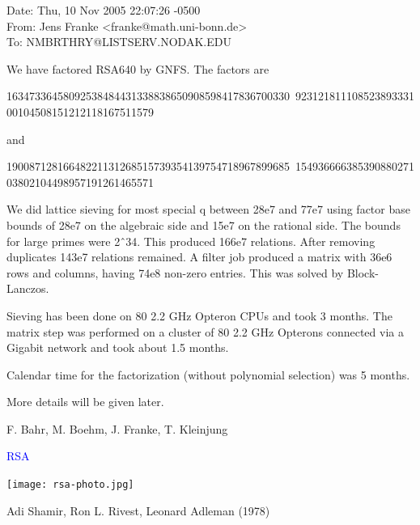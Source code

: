 \documentclass[landscape]{powersem} %
\newcommand{\psd}{\pause}%
\newcommand{\heading}[1]{%
 \begin{center}
  \large\bf
  \Ovalbox{{\textcolor{conceptcolor}{#1}}}%
 \end{center}
 \vspace{1ex minus 1ex}}
\begin{document}
\begin{slide}
\heading{Last Minute News}\vspace{-4mm}\psd
\begin{scriptsize}
\begin{tt}
\noindent
 Date: Thu, 10 Nov 2005 22:07:26 -0500\\
 From: Jens Franke <franke@math.uni-bonn.de>\\
 To: NMBRTHRY@LISTSERV.NODAK.EDU

We have factored RSA640 by GNFS. The factors are

16347336458092538484431338838650908598417836700330\
92312181110852389333100104508151212118167511579

and

19008712816648221131268515739354139754718967899685\
15493666638539088027103802104498957191261465571

We did lattice sieving for most special q between 28e7 and 77e7
using factor base bounds of 28e7 on the algebraic side and 15e7 on
the rational side. The bounds for large primes were 2\^\ 34. This
produced 166e7 relations. After removing duplicates 143e7 relations
remained. A filter job produced a matrix with 36e6 rows and columns,
having 74e8 non-zero entries. This was solved by Block-Lanczos.

Sieving has been done on 80 2.2 GHz Opteron CPUs and took 3 months.
The matrix step was performed on a cluster of 80 2.2 GHz Opterons
connected via a Gigabit network and took about 1.5 months.

Calendar time for the factorization (without polynomial selection)
was 5 months.

More details will be given later.

F. Bahr, M. Boehm, J. Franke, T. Kleinjung
\end{tt}\end{scriptsize}

\end{slide}

\begin{slide}

\centerline{\Large{\textcolor{blue}{RSA}}}

\centerline{\texttt{[image: rsa-photo.jpg]}}

\centerline{Adi Shamir, Ron L. Rivest, Leonard Adleman (1978)}
\end{slide}
\end{document}

